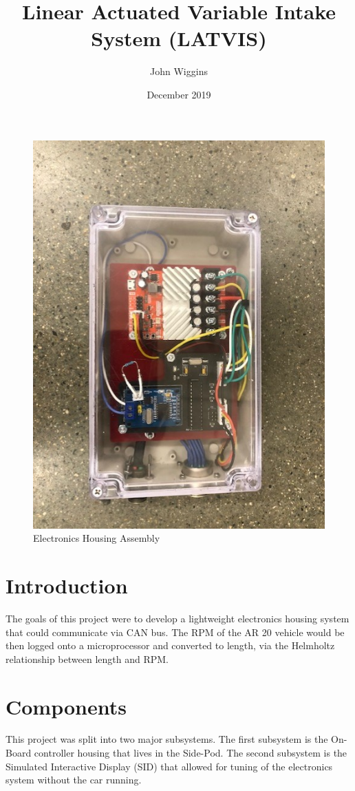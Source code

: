 \documentclass{article}
\title{Linear Actuated Variable Intake System (LATVIS)}
\author{John Wiggins }
\date{December 2019}
\begin{document}
\maketitle

\begin{figure}[h!]
\centering
\includegraphics[scale=0.5, angle = 90]{Electronics_Housing.jpg}
\caption{Electronics Housing Assembly}
\label{fig:assembly}
\end{figure}

\section{Introduction}
The goals of this project were to develop a lightweight electronics housing system that could communicate via CAN bus. The RPM of the AR 20 vehicle would be then logged onto a microprocessor and converted to length, via the Helmholtz relationship between length and RPM.

\section{Components}
This project was split into two major subsystems. The first subsystem is the On-Board controller housing that lives in the Side-Pod. The second subsystem is the Simulated Interactive Display (SID) that allowed for tuning of the electronics system without the car running.
\end{document}
